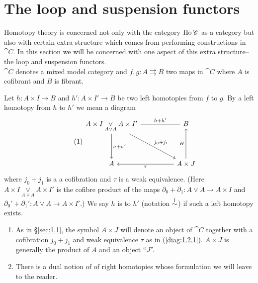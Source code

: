 \documentclass[../main]{subfiles}
\begin{document}
\section{The loop and suspension functors}\label{sec:1.2}
Homotopy theory is concerned not only with the category $\operatorname{Ho} \mathscr{C}$ as a category but also with certain extra structure which comes from performing constructions in $\cat{C}$. In this section we will be concerned with one aspect of this extra structure--the loop and suspension functors.\\
$\cat{C}$ denotes a mixed model category and $f, g \colon A \rightrightarrows B$ two maps in $\cat{C}$ where $A$ is cofibrant and $B$ is fibrant.

\begin{definition}
\label{def:1.2.1}
Let $h \colon A \times I \longrightarrow B$ and $h' \colon A \times I' \longrightarrow B$ be two left homotopies from $f$ to $g$. By a left homotopy from $h$ to $h'$ we mean a diagram
\[\tag{1}\label{diag:1.2.1}
\begin{tikzcd}
    A \times I \underset{A \vee A}{\vee} A \times I' \arrow[dd, "\sigma + \sigma'"] \arrow[rrdd, "j_0 + j_1"]  \arrow[rr, no head, "h+h'"] & & B \\
    \\
    A  & & \arrow[ll, "\tau"] A \times J \arrow[uu, "H"]
\end{tikzcd} 
\]
where $j_0 + j_1$ is a a cofibration and $\tau$ is a weak equivalence. (Here $A \times I \underset{A \vee A}{\vee} A \times I'$ is the cofibre product of the maps  $\partial_0 + \partial_1 \colon A \vee A \longrightarrow A \times I$ and \\$\partial_0' + \partial_1' \colon A \vee A \longrightarrow A \times I'$.) We say $h$ is  to $h'$ (notation $\overset{l}{\sim}$) if such a left homotopy exists.
\end{definition}
\begin{remarks*}
    \begin{enumerate}
        \item\label{rem:1.2.1} As in \S\ref{sec:1.1}, the symbol $A \times J$ will denote an object of $\cat{C}$ together with a cofibration $j_0 + j_1$ and weak equivalence $\tau$ as in (\ref{diag:1.2.1}). $A \times J$ is  generally the product of $A$ and an object ``$J$''.
        \item\label{rem:1.2.2} There is a dual notion of  of right homotopies whose formulation we will leave to the reader.
    \end{enumerate}
\end{remarks*}
\end{document}
